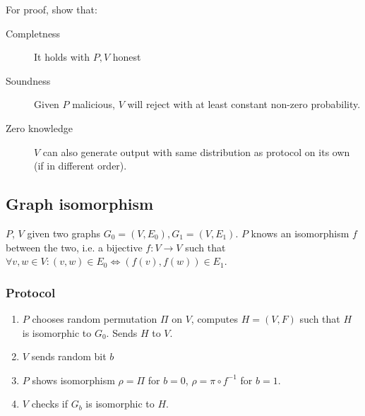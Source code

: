 For proof, show that:
\begin{description}
		\item[Completness] It holds with $P, V$ honest
		\item[Soundness] Given $P$ malicious, $V$ will reject with at least
				constant non-zero probability.
		\item[Zero knowledge] $V$ can also generate output with same
				distribution as protocol on its own (if in different order).
\end{description}

\subsection{Graph isomorphism}

$P$, $V$ given two graphs $G_0 = (V, E_0), G_1 = (V, E_1)$. $P$ knows an
isomorphism $f$ between the two, i.e. a bijective $f: V \rightarrow V$ such that
$\forall v, w \in V: (v, w) \in E_0 \Leftrightarrow (f(v), f(w)) \in E_1$.

\subsubsection{Protocol}

\begin{enumerate}
		\item $P$ chooses random permutation $\Pi$ on $V$, computes $H = (V,
				F)$ such that $H$ is isomorphic to $G_0$. Sends $H$ to $V$.
		\item $V$ sends random bit $b$
		\item $P$ shows isomorphism $\rho = \Pi$ for $b = 0$, $\rho = \pi \circ
				f^{-1}$ for $b = 1$.
		\item $V$ checks if $G_b$ is isomorphic to $H$.
\end{enumerate}
